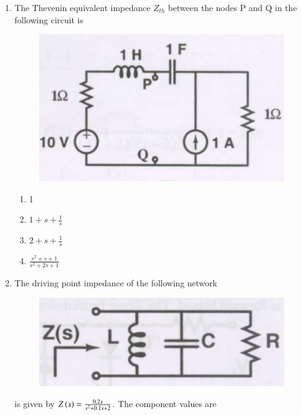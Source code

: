 \documentclass[a4paper, 11pt]{article}
\begin{document}
\begin{enumerate}
    \hfill{}

    \item The Thevenin equivalent impedance $Z_{th}$ between the nodes P and Q in the following circuit is
    \begin{figure}[H]
        \centering
        \includegraphics[width=0.6\columnwidth]{figs/q21.png}
        \caption*{}
        \label{fig:q21}
    \end{figure}
    \begin{enumerate}
        \item 1
        \item $1+s+\frac{1}{s}$
        \item $2+s+\frac{1}{s}$
        \item $\frac{s^2+s+1}{s^2+2s+1}$
    \end{enumerate}
    
    \hfill{}

    \item The driving point impedance of the following network
    \begin{figure}[H]
        \centering
        \includegraphics[width=0.3\columnwidth]{figs/q22.png}
        \caption*{}
        \label{fig:q22}
    \end{figure}
    is given by $Z\left(s\right) = \frac{0.2s}{s^2+0.1s+2}$. The component values are
    \begin{enumerate}
    \end{enumerate}
    

\end{enumerate}
\end{document}
